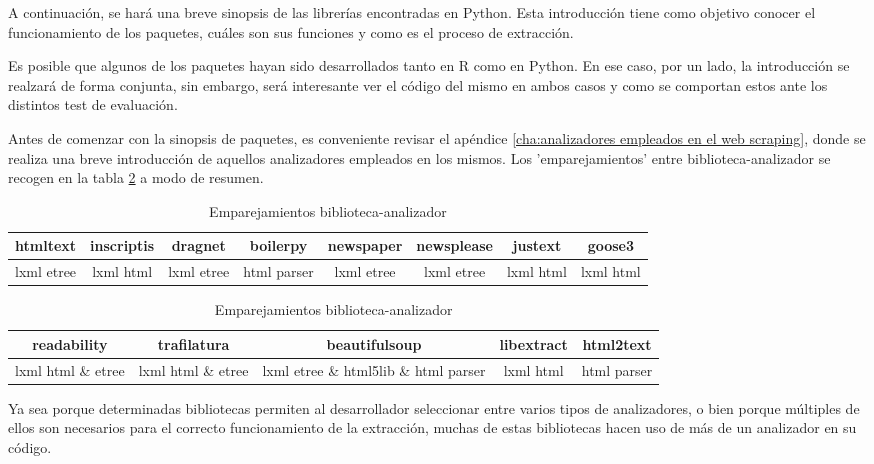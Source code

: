 A continuación, se hará una breve sinopsis de las librerías encontradas en Python. Esta introducción tiene
como objetivo conocer el funcionamiento de los paquetes, cuáles son sus funciones y como es el proceso de
extracción.

Es posible que algunos de los paquetes hayan sido desarrollados tanto en R como en Python. En ese caso, por 
un lado, la introducción se realzará de forma conjunta, sin embargo, será interesante ver el código del 
mismo en ambos casos y como se comportan estos ante los distintos test de evaluación.

Antes de comenzar con la sinopsis de paquetes, es conveniente revisar el apéndice \ref{cha:analizadores
empleados en el web scraping}, donde se realiza una breve introducción de aquellos analizadores empleados
en los mismos. Los 'emparejamientos' entre biblioteca-analizador se recogen en la tabla 
\ref{tab:emparejamientos biblioteca-analizador} a modo de resumen.

\begin{table}[h]
  \begin{center}
  \begin{tabular}{| c | c | c | c | c | c | c | c |} \hline 
    \textbf{htmltext} & \textbf{inscriptis} & \textbf{dragnet} & \textbf{boilerpy} & \textbf{newspaper} & \textbf{newsplease} & \textbf{justext} & \textbf{goose3} \\ \hline
    lxml etree & lxml html & lxml etree & html parser & lxml etree & lxml etree & lxml html & lxml html \\ \hline
  \end{tabular}

  \hfill \break

  \begin{tabular}{| c | c | c | c | c |} \hline 
    \textbf{readability} & \textbf{trafilatura} & \textbf{beautifulsoup} & \textbf{libextract} & \textbf{html2text}  \\ \hline
    lxml html \& etree & lxml html \& etree & lxml etree \& html5lib \& html parser & lxml html & html parser \\ \hline
  \end{tabular}

  \caption{Emparejamientos biblioteca-analizador}
  \label{tab:emparejamientos biblioteca-analizador}
  \end{center}
\end{table}

Ya sea porque determinadas bibliotecas permiten al desarrollador seleccionar entre varios tipos de 
analizadores, o bien porque múltiples de ellos son necesarios para el correcto funcionamiento de la 
extracción, muchas de estas bibliotecas hacen uso de más de un analizador en su código.

